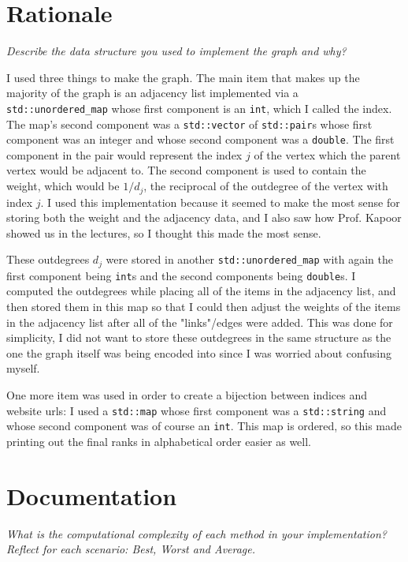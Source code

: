 \documentclass[11pt]{article}
\begin{document}
\section{Rationale}

\textit{Describe the data structure you used to implement the graph and why?}

I used three things to make the graph. The main item that makes up the majority of the graph is an adjacency list implemented via a \texttt{std::unordered\_map} whose first component is an \texttt{int}, which I called the index. The map's second component was a \texttt{std::vector} of  \texttt{std::pair}s whose first component was an integer and whose second component was a \texttt{double}. The first component in the pair would represent the index $j$ of the vertex which the parent vertex would be adjacent to. The second component is used to contain the weight, which would be $1/d_j$, the reciprocal of the outdegree of the vertex with index $j$. I used this implementation because it seemed to make the most sense for storing both the weight and the adjacency data, and I also saw how Prof. Kapoor showed us in the lectures, so I thought this made the most sense.

These outdegrees $d_j$ were stored in another \texttt{std::unordered\_map} with again the first component being \texttt{int}s and the second components being \texttt{double}s. I computed the outdegrees while placing all of the items in the adjacency list, and then stored them in this map so that I could then adjust the weights of the items in the adjacency list after all of the "links"/edges were added. This was done for simplicity, I did not want to store these outdegrees in the same structure as the one the graph itself was being encoded into since I was worried about confusing myself.

One more item was used in order to create a bijection between indices and website urls: I used a \texttt{std::map} whose first component was a \texttt{std::string} and whose second component was of course an \texttt{int}. This map is ordered, so this made printing out the final ranks in alphabetical order easier as well.

\section{Documentation}

\textit{What is the computational complexity of each method in your implementation? Reflect for each scenario: Best, Worst and Average.}
\end{document}
